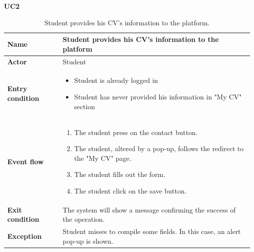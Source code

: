     \textbf{UC2}
    \begin{table}[H]
    \centering
    \begin{tabular}{|l|p{11.9cm}|}
        \hline
        \textbf{Name}            & Student provides his CV’s information to the platform \\\hline
        \textbf{Actor}           & Student         \\\hline
        \textbf{Entry condition} &
        \begin{itemize}
              \item Student is already logged in
              \item Student has never provided his information in "My CV" section
        \end{itemize}                                        \\\hline
        \textbf{Event flow}      &
        \begin{enumerate}[label=\arabic*.]
            \item The student press on the contact button.
            \item The student, altered by a pop-up, follows the redirect to the "My CV" page.
            \item The student fills out the form.
            \item The student click on the save button.
        \end{enumerate}            \\\hline
        \textbf{Exit condition}  & The system will show a message confirming the success of the operation.\\\hline
        
        \textbf{Exception}       &  Student misses to compile some fields. In this case, an alert pop-up is shown.  \\\hline
    \end{tabular}
    \caption{Student provides his CV’s information to the platform.}
    \label{table:Student provides his CV’s information to the platform}
    \end{table}

